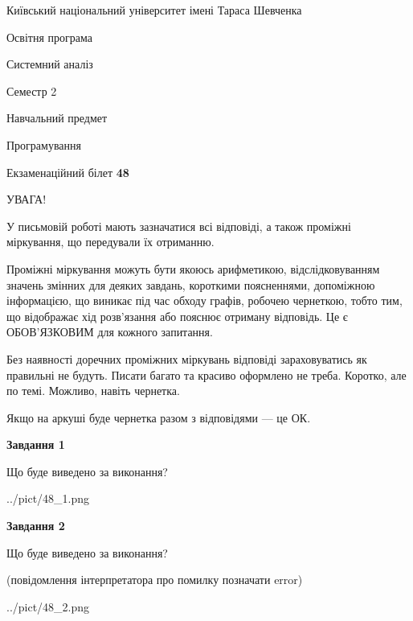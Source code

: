 \documentclass[12pt, ukrainian]{article}
\begin{document}
{{\begin {small}\par
{ \center  Київський національний університет імені Тараса Шевченка \par}
{\parbox {5 cm}{Освітня програма \hfill}{\parbox {7 cm}{Системний аналіз \hfill}}\parbox {6 cm}{\hfill Семестр 2}}\par
{\parbox {5 cm} {Навчальний предмет \hfill}\parbox {7 cm}{Програмування \hfill}\parbox {6cm}{\hfill}\par}\vspace{-7pt} \end{small}}{\center Екзаменаційний білет \No \textbf
{ 48 }\par}}
{
\begin {large}
УВАГА!

У письмовій роботі мають зазначатися всі відповіді, а також проміжні міркування, що передували їх отриманню.

Проміжні міркування можуть бути якоюсь арифметикою, відслідковуванням зна\-чень змінних для деяких завдань,
короткими поясненнями, допоміжною інформацією, що виникає під час обходу графів, робочею чернеткою,
тобто тим, що відображає хід розв’язання або пояснює отриману відповідь.
Це є ОБОВ’ЯЗКОВИМ для кожного запитання.

Без наявності доречних проміжних міркувань відповіді зараховуватись як правиль\-ні не будуть.
Писати багато та красиво оформлено не треба. Коротко, але по темі. Можли\-во, навіть чернетка.

Якщо на аркуші буде чернетка разом з відповідями --- це ОК.

\newpage

{\begin {center}\textbf{Завдання 1}\end {center}}\par
Що буде виведено за виконання?\par
\begin{center}
	{../pict/48_1.png}
\end{center}
\newpage

{\begin {center}\textbf{Завдання 2}\end {center}}\par
Що буде виведено за виконання?\par
 (повідомлення інтерпретатора про помилку позначати error)\par
\begin{center}
	{../pict/48_2.png}
\end{center}
\newpage


\end{large}}
\end{document}
